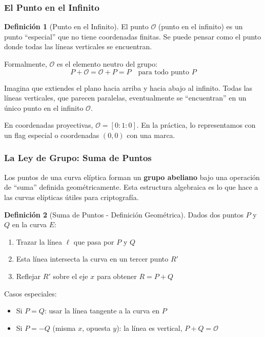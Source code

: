 \documentclass[11pt,a4paper,twoside,openright]{book}
\theoremstyle{definition}
\newtheorem{definition}{Definición}[chapter]
\theoremstyle{plain}
\theoremstyle{remark}
\begin{document}
\subsubsection{El Punto en el Infinito}

\begin{definition}[Punto en el Infinito]
El punto $\mathcal{O}$ (punto en el infinito) es un punto ``especial'' que no tiene coordenadas finitas. Se puede pensar como el punto donde todas las líneas verticales se encuentran.

Formalmente, $\mathcal{O}$ es el elemento neutro del grupo:
\[
P + \mathcal{O} = \mathcal{O} + P = P \quad \text{para todo punto } P
\]
\end{definition}

\begin{intuicion}
Imagina que extiendes el plano hacia arriba y hacia abajo al infinito. Todas las líneas verticales, que parecen paralelas, eventualmente se ``encuentran'' en un único punto en el infinito $\mathcal{O}$.

En coordenadas proyectivas, $\mathcal{O} = [0 : 1 : 0]$. En la práctica, lo representamos con un flag especial o coordenadas $(0, 0)$ con una marca.
\end{intuicion}

\subsubsection{La Ley de Grupo: Suma de Puntos}

\begin{keyidea}
Los puntos de una curva elíptica forman un \textbf{grupo abeliano} bajo una operación de ``suma'' definida geométricamente. Esta estructura algebraica es lo que hace a las curvas elípticas útiles para criptografía.
\end{keyidea}

\begin{definition}[Suma de Puntos - Definición Geométrica]
Dados dos puntos $P$ y $Q$ en la curva $E$:
\begin{enumerate}
    \item Trazar la línea $\ell$ que pasa por $P$ y $Q$
    \item Esta línea intersecta la curva en un tercer punto $R'$
    \item Reflejar $R'$ sobre el eje $x$ para obtener $R = P + Q$
\end{enumerate}

Casos especiales:
\begin{itemize}
    \item Si $P = Q$: usar la línea tangente a la curva en $P$
    \item Si $P = -Q$ (misma $x$, opuesta $y$): la línea es vertical, $P + Q = \mathcal{O}$
\end{itemize}
\end{definition}
\end{document}
